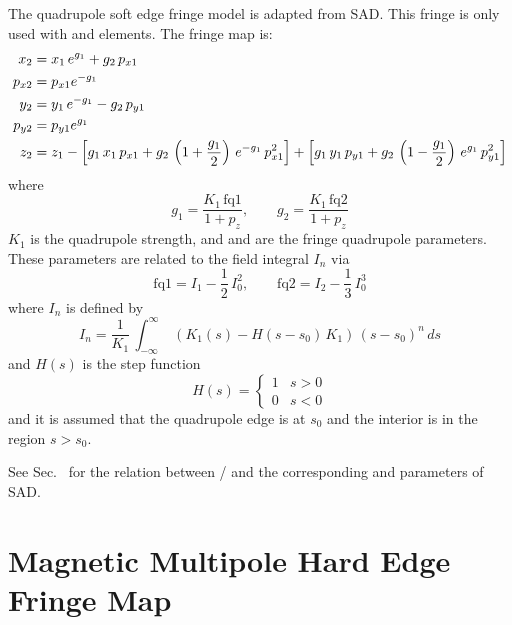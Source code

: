 {The quadrupole soft edge fringe model is adapted from SAD\cite{b:sad}. This fringe is only used with
 and  elements. The fringe map is:
\begin{align}
  x_2 &= x_1 \, e^{g_1} + g_2 \, p_{x1} \nonumber \\
  p_{x2} &= p_{x1} e^{-g_1} \nonumber \\
  y_2 &= y_1 \, e^{-g_1} - g_2 \, p_{y1} \\
  p_{y2} &= p_{y1} e^{g_1} \nonumber \\
  z_2 &= z_1 - 
    \left[g_1 \, x_1 \, p_{x1} + g_2 \, \left( 1 + \frac{g_1}{2} \right)
    \, e^{-g_1} \, p_{x1}^2 \right] + 
    \left[g_1 \, y_1 \, p_{y1} + g_2 \, \left( 1 - \frac{g_1}{2} \right)
    \, e^{g_1} \, p_{y1}^2 \right] \nonumber
\end{align}
where
\begin{equation}
  g_1 = \frac{K_1 \, \text{fq1}}{1 + p_z} , \qquad
  g_2 = \frac{K_1 \, \text{fq2}}{1 + p_z}
\end{equation}
$K_1$ is the quadrupole strength, and  and  are the fringe
quadrupole parameters. These parameters are related to the field integral $I_n$
via
\begin{equation}
  \text{fq1} = I_1 - \frac{1}{2} \, I_0^2 , \qquad
  \text{fq2} = I_2 - \frac{1}{3} \, I_0^3
\end{equation}
where $I_n$ is defined by
\begin{equation}
  I_n = \frac{1}{K_1} \, \int_{-\infty}^{\infty} \; 
    (K_1(s) - H(s-s_0) \, K_1) \, (s - s_0)^n \, ds
\end{equation}
and $H(s)$ is the step function
\begin{equation}
  H(s) = \begin{cases}
    1   & s > 0 \\
    0   & s < 0
  \end{cases}
\end{equation}
and it is assumed that the quadrupole edge is at $s_0$ and the interior is 
in the region $s > s_0$. 

See Sec.~ for the relation between  /  and
the corresponding  and  parameters of SAD.

\section{Magnetic Multipole Hard Edge Fringe Map}

}
